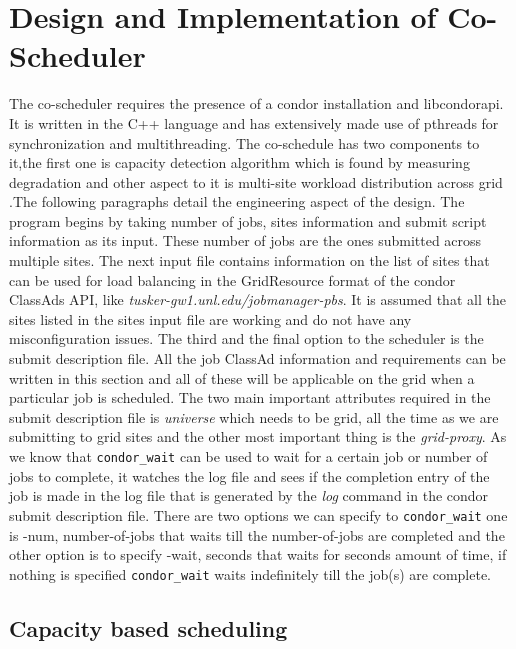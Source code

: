 \documentclass[ms,electronic,double]{nuthesis}
\begin{document}
\chapter{Design and Implementation of Co-Scheduler}
The co-scheduler requires the presence of a condor installation and libcondorapi.
It is written in the C++ language and has extensively made use of pthreads for 
synchronization and multithreading. The co-schedule has two components to it,the first one is capacity detection
algorithm which is found by measuring degradation and other aspect to it is 
multi-site workload distribution across grid .The following  paragraphs detail the 
engineering aspect of the design.
The program begins by taking number of jobs, sites information and submit script 
information as its input. These number of jobs are the ones submitted across 
multiple sites. The next input file contains information on the list of sites that can be used 
for load balancing in the GridResource format of the condor ClassAds API, like \emph{tusker-gw1.unl.edu/jobmanager-pbs}.
It is assumed that all the sites listed in the sites input file are working and 
do not have any misconfiguration issues. The third and the final option to the 
scheduler is the submit description file. All the job ClassAd information and 
requirements can be written in this section and all of these will be applicable on the grid when a particular job is 
scheduled. The two main important attributes required in the submit description 
file is \emph{universe} which needs to be grid, all the time as we are submitting 
to grid sites and the other most important thing is the 
\emph{grid-proxy}. 
As we know that \texttt{condor\_wait} can be used to wait for a certain job or 
number of jobs to complete, it watches the log file and sees if the completion 
entry of the job is made in the log file that is generated by the \emph{log} 
command in the condor submit description file. There are two options we can 
specify to \texttt{condor\_wait} one is -num, number-of-jobs that waits
till the number-of-jobs are completed and the other option is to specify -wait, seconds that 
waits for seconds amount of time, if nothing is specified \texttt{condor\_wait} waits indefinitely till
the job(s) are complete.

\section{Capacity based scheduling}
\end{document}

